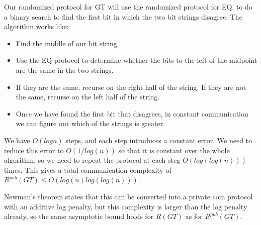 \documentclass{article}
\newenvironment{problem}[2][Problem]{\begin{trivlist}
\item[\hskip \labelsep {\bfseries #1}\hskip \labelsep {\bfseries #2.}]}{\end{trivlist}}
\begin{document}
\begin{problem}{2}
  Our randomized protocol for GT will use the randomized protocol for
  EQ, to do a binary search to find the first bit in which the two bit
  strings disagree. The algorithm works like:
  \begin{itemize}
  \item Find the middle of our bit string.
  \item Use the EQ protocol to determine whether the bits to the
    left of the midpoint are the same in the two strings.
  \item If they are the same, recurse on the right half of the
    string. If they are not the same, recurse on the left half of
    the string.
  \item Once we have found the first bit that disagrees, in
    constant communication we can figure out which of the
    strings is greater. 
  \end{itemize}
  We have $O(log n)$ steps, and each step introduces a constant
  error. We need to reduce this error to $O(1 / log(n))$ so that it is
  constant over the whole algorithm, so we need to
  repeat the protocol at each steg $O(log(log(n)))$ times. This gives a
  total communication complexity of $R^{pub}(GT) \leq O(log(n)
  log(log(n)))$.

  Newman's theorem states that this can be converted into a private
  coin protocol with an additive log penalty, but this complexity is
  larger than the log penalty already, so the same asymptotic bound holds for
  $R(GT)$ as for $R^{pub}(GT)$.
\end{problem}
\end{document}
